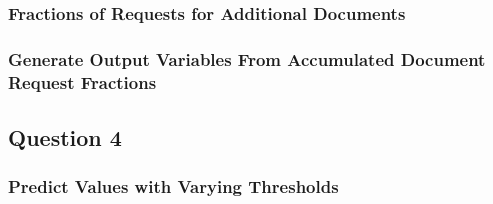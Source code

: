 \documentclass[a4paper,12pt]{article}
\numberwithin{equation}{section}
\numberwithin{figure}{section}
\numberwithin{table}{section}
\begin{document}
\begin{appendices}
\subsubsection{Fractions of Requests for Additional Documents}
\label{requests}


\newpage
\subsubsection{Generate Output Variables From Accumulated Document Request Fractions}
\label{getval}

\newpage
\subsection{Question 4}
\subsubsection{Predict Values with Varying Thresholds}
\label{predict}

\end{appendices}
\end{document}
